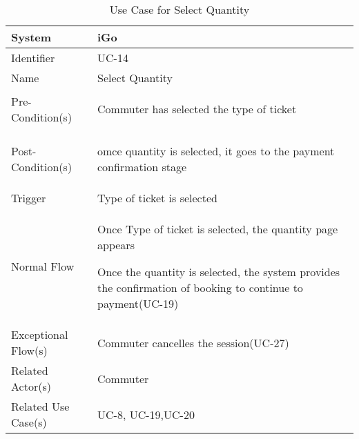 \begin{table}[ht]
    \centering
    \begin{tabular}{|l|p{11cm}|}
        \hline
        System             & iGo\\
        \hline
        Identifier         & UC-14 \\
        \hline
        Name               & Select Quantity \\
        \hline
        Pre-Condition(s)   & 
        \begin{enumerate*}[itemjoin=\newline]
            \item Commuter has selected the type of ticket
        \end{enumerate*} \\
        \hline
        Post-Condition(s)  & 
        \begin{enumerate*}[itemjoin=\newline]
            \item omce quantity is selected, it goes to the payment confirmation stage
        \end{enumerate*} \\
        \hline
        Trigger            & Type of ticket is selected \\
        \hline
        Normal Flow        & 
        \begin{enumerate*}[itemjoin=\newline]
            \item Once Type of ticket is selected, the quantity page appears
            \item Once the quantity is selected, the system provides the confirmation of booking to continue to payment(UC-19)
        \end{enumerate*} \\
        \hline
        Exceptional Flow(s)& Commuter cancelles the session(UC-27)\\
        \hline
        Related Actor(s)   & Commuter\\
        \hline
        Related Use Case(s)& UC-8, UC-19,UC-20\\
        \hline
    \end{tabular}
    \caption{Use Case for Select Quantity}
    \label{tab:UC_Select Quantity Cash}
\end{table}
